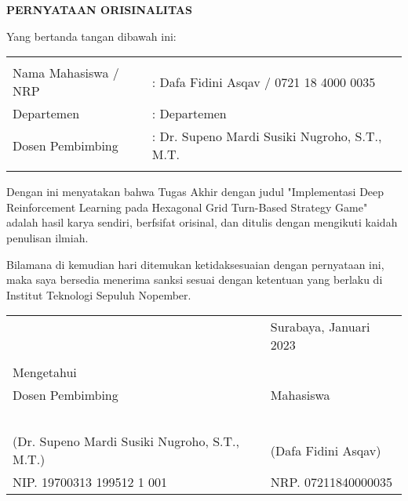 \begin{center}
  \large
  \textbf{PERNYATAAN ORISINALITAS}
\end{center}

\thispagestyle{empty}

\vspace{2ex}


\noindent Yang bertanda tangan dibawah ini:

\noindent\begin{tabularx}{\textwidth}{X X l}
  & \\
  Nama Mahasiswa / NRP &: Dafa Fidini Asqav / 0721 18 4000 0035 \\
  Departemen &: Departemen \\
  Dosen Pembimbing &: Dr. Supeno Mardi Susiki Nugroho, S.T., M.T.  \\
  & \\
\end{tabularx}

Dengan ini menyatakan bahwa Tugas Akhir dengan judul "Implementasi Deep Reinforcement Learning pada Hexagonal Grid Turn-Based Strategy Game" adalah hasil karya sendiri, berfsifat orisinal, dan ditulis dengan mengikuti kaidah penulisan ilmiah.

Bilamana di kemudian hari ditemukan ketidaksesuaian dengan pernyataan ini, maka saya bersedia menerima sanksi sesuai dengan ketentuan yang berlaku di Institut Teknologi Sepuluh Nopember.

\vspace{8ex}

\noindent\begin{tabularx}{\textwidth}{X l}
  & Surabaya, Januari 2023\\
  & \\
  Mengetahui & \\
  Dosen Pembimbing & Mahasiswa\\
  & \\
  & \\
  & \\
  & \\
  & \\
  (Dr. Supeno Mardi Susiki Nugroho, S.T., M.T.) & (Dafa Fidini Asqav) \\
  NIP. 19700313 199512 1 001 & NRP. 07211840000035 \\
\end{tabularx}